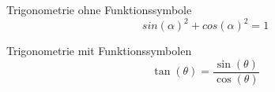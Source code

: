 \documentclass[12pt,a5paper]{book}
\begin{document}
Trigonometrie ohne Funktionssymbole
\begin{equation}
sin(\alpha)^2 + cos(\alpha)^2 = 1
\end{equation}

Trigonometrie mit Funktionssymbolen
\begin{equation}
\tan(\theta)=\frac{\sin(\theta)}{\cos(\theta)}
\end{equation}
\end{document}
